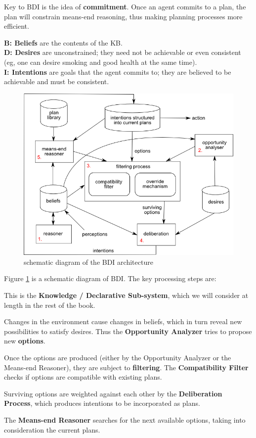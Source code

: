 Key to BDI is the idea of \textbf{commitment}.  Once an agent commits to a plan, the plan will constrain means-end reasoning, thus making planning processes more efficient.

\textbf{B: Beliefs} are the contents of the KB.\\
\textbf{D: Desires} are unconstrained;  they need not be achievable or even consistent (eg, one can desire smoking and good health at the same time).\\
\textbf{I: Intentions} are goals that the agent commits to;  they are believed to be achievable and must be consistent.

\begin{figure}[t]
\centering
\includegraphics[scale=0.7]{BDI-architecture.png}
\caption{schematic diagram of the BDI architecture}
\label{fig:BDI-arch}
\end{figure}

Figure \ref{fig:BDI-arch} is a schematic diagram of BDI.  The key processing steps are:
\begin{compactenum-}
\item  This is the \textbf{Knowledge / Declarative Sub-system}, which we will consider at length in the rest of the book.
\item  Changes in the environment cause changes in beliefs, which in turn reveal new possibilities to satisfy desires.  Thus the \textbf{Opportunity Analyzer} tries to propose new \textbf{options}.
\item  Once the options are produced (either by the Opportunity Analyzer or the Means-end Reasoner), they are subject to \textbf{filtering}.  The \textbf{Compatibility Filter} checks if options are compatible with existing plans.
\item  Surviving options are weighted against each other by the \textbf{Deliberation Process}, which produces intentions to be incorporated as plans.
\item  The \textbf{Means-end Reasoner} searches for the next available options, taking into consideration the current plans.
\end{compactenum-}

